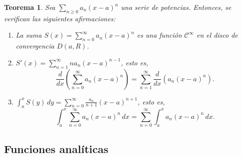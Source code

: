 \documentclass[11pt, a4paper]{article}
\theoremstyle{theorem-style}
\newtheorem{nth}{Teorema}[section]
\theoremstyle{definition-style}
\theoremstyle{remark-style}
\theoremstyle{example-style}
\newenvironment{nlist}
{\begin{enumerate}
    \renewcommand\labelenumi{(\emph{\roman{enumi})}}}
  {\end{enumerate}}
\begin{document}
\begin{nth} \label{14}
  Sea $\displaystyle\sum_{n\geq 0} a_n (x-a)^n$ una serie de potencias. Entonces, se verifican las siguientes afirmaciones:	
  \begin{nlist}
  \item La suma $S(x)=\displaystyle\sum_{n= 0}^\infty a_n (x-a)^n$ es una función $\mathcal{C}^\infty$ en el disco de convergencia $D(a,R)$.
  \item $S'(x)= \displaystyle\sum_{n= 1}^\infty n a_n (x-a)^{n-1}$, esto es,
    \[
      \displaystyle\frac{d}{dx} \left( \sum_{n= 0}^\infty a_n (x-a)^n \right) =  \sum_{n= 1}^\infty \frac{d}{dx} \left( a_n (x-a)^n \right) .
    \]
  \item 
    $\displaystyle \int_a^x S(y)\, dy =   \sum_{n= 0}^\infty \frac{a_n}{n+1} (x-a)^{n+1}$, esto es,
    \[
      \int_a^x  \sum_{n= 0}^\infty a_n (x-a)^n \, dx 
      =  \sum_{n= 0}^\infty \int_a^x a_n (x-a)^n \, dx.
    \]
  \end{nlist}
  
  

\end{nth}



\subsection{Funciones analíticas}
\end{document}
